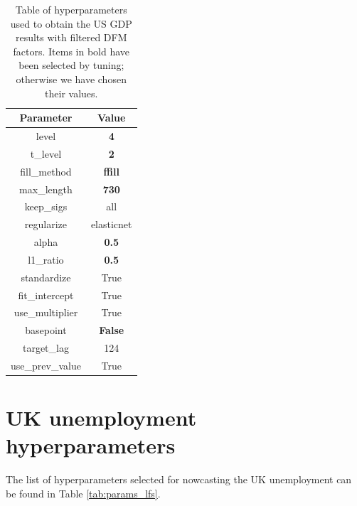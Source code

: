 \documentclass[a4paper, 12pt]{article}
\theoremstyle{remark}
\begin{document}
\begin{table}[h]
    \centering
    \caption{Table of hyperparameters used to obtain the US GDP results with filtered DFM factors. Items in bold have been selected by tuning; otherwise we have chosen their values.}
    \begin{tabular}{c c}
         Parameter & Value \\
         \hline
         \hline
        level & \textbf{4} \\
        t\_level & \textbf{2} \\
        fill\_method & \textbf{ffill} \\
        max\_length & \textbf{730} \\
        keep\_sigs & all \\
        regularize & elasticnet \\
        alpha & \textbf{0.5} \\
        l1\_ratio & \textbf{0.5} \\
        standardize & True \\
        fit\_intercept & True \\
        use\_multiplier &  True \\
        basepoint &  \textbf{False} \\
        target\_lag & 124 \\
        use\_prev\_value & True
        
    \end{tabular}
    \label{tab:params_gdp_dfm}
\end{table}


\section{UK unemployment hyperparameters}\label{app:lfshyper}

The list of hyperparameters selected for nowcasting the UK unemployment can be found in Table \ref{tab:params_lfs}.
\end{document}
